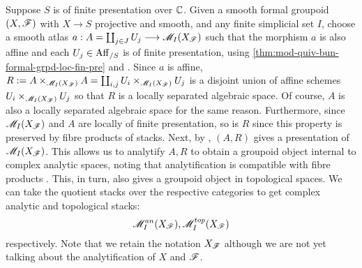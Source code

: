 \documentclass[11pt]{amsart}
\begin{document}
%


\begin{cns}\label{cns:analytification-mod-st-quiv-bun-formal-grpd}
Suppose $S$ is of finite presentation over $\mathbb{C}$.
Given a smooth formal groupoid $(X, \mathscr{F})$ with $X \to S$ projective and smooth,
and any finite simplicial set $I$, choose a smooth atlas
$a : A = \coprod_{j \in J} U_j \to \sM_I(X_\sF)$ such that the morphism $a$ is also
affine and each $U_j \in \mathrm{Aff}_{/S}$ is of finite presentation, using
\cref{thm:mod-quiv-bun-formal-grpd-loc-fin-pre} and
\cite[\href{https://stacks.math.columbia.edu/tag/04YF}{Lemma 04YF}]
{stacks-project}. Since $a$ is affine,
$R := A \times_{\mathscr{M}_I(X_\mathscr{F})} A = \coprod_{i, j} U_i \times_{\mathscr{M}_I(X_\mathscr{F})} U_j$
is a disjoint union of affine schemes $U_i \times_{\mathscr{M}_I(X_\mathscr{F})} U_j$
so that $R$ is a locally separated algebraic space. Of course, $A$ is also
a locally separated algebraic space for the same reason.
Furthermore, since $\mathscr{M}_I(X_\mathscr{F})$ and $A$ are locally of finite presentation,
so is $R$ since this property is preserved by fibre products of stacks.
Next, by
\cite[\href{https://stacks.math.columbia.edu/tag/04T5}{Lemma 04T5}]
{stacks-project},
$(A, R)$ gives a presentation of $\mathscr{M}_I(X_\mathscr{F})$.
This allows us to analytify $A, R$ \cite{GenGAGA} to obtain a groupoid object
internal to complex analytic spaces, noting that analytification is compatible
with fibre products \cite[Theorem 2.2.3.]{NonArchAnalytification}. This, in
turn, also gives a groupoid object in topological spaces. We can take the
quotient stacks over the respective categories to get complex analytic and
topological stacks:
\[
\mathscr{M}_I^{an}(X_\mathscr{F}), \mathscr{M}_I^{top}(X_\mathscr{F})
\]
respectively. Note that we retain the notation $X_\mathscr{F}$ although we are not yet
talking about the analytification of $X$ and $\mathscr{F}$.
\end{cns}
\end{document}
